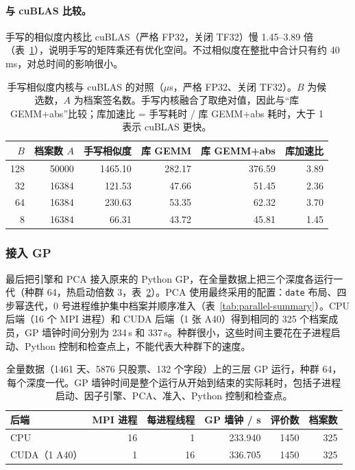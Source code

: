 \documentclass[11pt,a4paper,UTF8,fontset=fandol]{ctexart}
\newcommand{\code}[1]{\texttt{#1}}
\begin{document}
\paragraph{与 cuBLAS 比较。}手写的相似度内核比 cuBLAS（严格 FP32，关闭 TF32）慢 1.45--3.89 倍（表~\ref{tab:cublas}），说明手写的矩阵乘还有优化空间。不过相似度在整批中合计只有约 40\,ms，对总时间的影响很小。
\begin{table}[H]
\centering\small
\caption{手写相似度内核与 cuBLAS 的对照（$\mu$s，严格 FP32、关闭 TF32）。$B$ 为候选数，$A$ 为档案签名数。手写内核融合了取绝对值，因此与“库 GEMM+abs”比较；库加速比 = 手写耗时 / 库 GEMM+abs 耗时，大于 1 表示 cuBLAS 更快。}
\label{tab:cublas}
\begin{tabular}{rrrrrr}
\toprule
$B$ & 档案数 $A$ & 手写相似度 & 库 GEMM & 库 GEMM+abs & 库加速比 \\
\midrule
128 & 50000 & 1465.10 & 282.17 & 376.59 & 3.89 \\
32  & 16384 & 121.53  & 47.66  & 51.45  & 2.36 \\
64  & 16384 & 230.63  & 53.35  & 62.32  & 3.70 \\
8   & 16384 & 66.31   & 43.72  & 45.81  & 1.45 \\
\bottomrule
\end{tabular}
\end{table}

\subsubsection{接入 GP}
最后把引擎和 PCA 接入原来的 Python GP，在全量数据上把三个深度各运行一代（种群 64，热启动倍数 3，表~\ref{tab:live-gp}）。PCA 使用最终采用的配置：\code{date} 布局、四步幂迭代，0 号进程维护集中档案并顺序准入（表~\ref{tab:parallel-summary}）。CPU 后端（16 个 MPI 进程）和 CUDA 后端（1 张 A40）得到相同的 325 个档案成员，GP 墙钟时间分别为 234\,s 和 337\,s。种群很小，这些时间主要花在子进程启动、Python 控制和检查点上，不能代表大种群下的速度。
\begin{table}[H]
\centering\small
\caption{全量数据（1461 天、5876 只股票、132 个字段）上的三层 GP 运行，种群 64，每个深度一代。GP 墙钟时间是整个运行从开始到结束的实际耗时，包括子进程启动、因子引擎、PCA、准入、Python 控制和检查点。}
\label{tab:live-gp}
\begin{tabular}{lrrrrr}
\toprule
后端 & MPI 进程 & 每进程线程 & GP 墙钟 / s & 评价数 & 档案数 \\
\midrule
CPU & 16 & 1 & 233.940 & 1450 & 325 \\
CUDA（1 A40） & 1 & 16 & 336.705 & 1450 & 325 \\
\bottomrule
\end{tabular}
\end{table}
\end{document}
